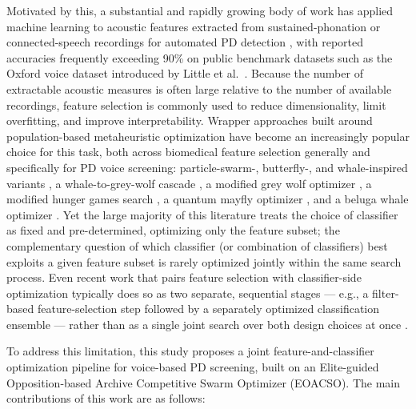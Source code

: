 Motivated by this, a substantial and rapidly growing body of work has
applied machine learning to acoustic features extracted from
sustained-phonation or connected-speech recordings for automated PD
detection \cite{Amato:2023}, with reported accuracies frequently exceeding
90\% on public benchmark datasets such as the Oxford voice dataset
introduced by Little et al.~\cite{Little:2008}. Because the number of
extractable acoustic measures is often large relative to the number of
available recordings, feature selection is commonly used to reduce
dimensionality, limit overfitting, and improve interpretability. Wrapper
approaches built around population-based metaheuristic optimization have
become an increasingly popular choice for this task, both across
biomedical feature selection generally \cite{BarreraGarcia:2023} and
specifically for PD voice screening: particle-swarm-, butterfly-, and
whale-inspired variants \cite{Hashemi:2026}, a whale-to-grey-wolf cascade
\cite{AlNajjar:2024}, a modified grey wolf optimizer \cite{Santhosh:2025},
a modified hunger games search \cite{Hashim:2023}, a quantum mayfly
optimizer \cite{Mansour:2024}, and a beluga whale optimizer
\cite{Ganesan:2025}.
Yet the large majority of this literature treats the choice of classifier
as fixed and pre-determined, optimizing only the feature subset; the
complementary question of which classifier (or combination of
classifiers) best exploits a given feature subset is rarely optimized
jointly within the same search process. Even recent work that pairs
feature selection with classifier-side optimization typically does so as
two separate, sequential stages --- e.g., a filter-based feature-selection
step followed by a separately optimized classification ensemble --- rather
than as a single joint search over both design choices at once
\cite{Gunduz:2025}.

To address this limitation, this study proposes a joint
feature-and-classifier optimization pipeline for voice-based PD
screening, built on an Elite-guided Opposition-based Archive Competitive
Swarm Optimizer (EOACSO). The main contributions of this work are as
follows:

